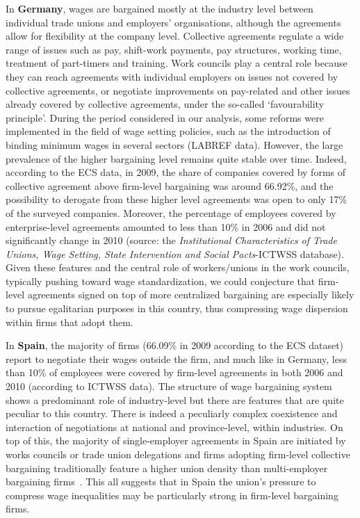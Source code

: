 \documentclass[Review,times,sageh,11pt]{sagej}
\begin{document}
In \textbf{Germany}, wages are bargained mostly at the industry level between individual trade unions and employers' organisations, although the agreements allow for flexibility at the company level. Collective agreements regulate a wide range of issues such as pay, shift-work payments, pay structures, working time, treatment of part-timers and training. Work councils play a central role because they can reach agreements with individual employers on issues not covered by collective agreements, or negotiate improvements on pay-related and other issues already covered by collective agreements, under the so-called ‘favourability principle’.
During the period considered in our analysis, some reforms were implemented in the field of wage setting policies, such as the introduction of binding minimum wages in several sectors (LABREF data). However, the large prevalence of the higher bargaining level remains quite stable over time. Indeed, according to the ECS data, in 2009, the share of companies covered by forms of collective agreement above firm-level bargaining was around 66.92\%, and the possibility to derogate from these higher level agreements was open to only 17\% of the surveyed companies. Moreover, the percentage of employees covered by enterprise-level agreements amounted to less than 10\% in 2006 and did not significantly change in 2010 (source: the \textit{Institutional Characteristics of Trade Unions, Wage Setting, State Intervention and Social Pacts}-ICTWSS database). Given these features and the central role of workers/unions in the work councils, typically pushing toward wage standardization, we could conjecture that firm-level agreements signed on top of more centralized bargaining are especially likely to pursue egalitarian purposes in this country, thus compressing wage dispersion within firms that adopt them.

In \textbf{Spain}, the majority of firms (66.09\% in 2009 according to the ECS dataset) report to negotiate their wages outside the firm, and much like in Germany, less than 10\% of employees were covered by firm-level agreements in both 2006 and 2010 (according to ICTWSS data). The structure of wage bargaining system shows a predominant role of industry-level but there are features that are quite peculiar to this country. There is indeed a peculiarly complex coexistence and interaction of negotiations at national and province-level, within industries. On top of this, the majority of single-employer agreements in Spain are initiated by works
councils or trade union delegations and firms adopting firm-level collective bargaining traditionally feature a higher union density than multi-employer bargaining firms~\citep{plasman.rusinek.ea.2007}. This all suggests that in Spain the union's pressure to compress wage inequalities may be particularly strong in firm-level bargaining firms.
\end{document}
